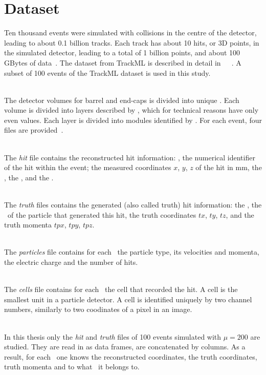 \section{Dataset}

Ten thousand events were simulated with collisions in the centre of the detector, leading to about 0.1 billion tracks. Each track has about 10 hits, or 3D points, in the simulated detector, leading to a total of 1 billion points, and about 100 GBytes of data~\cite{TrackMLPPTAfter2}. The dataset from TrackML is described in detail in~\cite{TrackMLPaperAccuracyPhase}~\cite{TrackMLPaper}~\cite{TrackMLPaperHAL}. A subset of 100 events of the TrackML dataset is used in this study.

\ \\The detector volumes for barrel and end-caps is divided into unique \volumeID. Each volume is divided into layers described by \layerID, which for technical reasons have only even values. Each layer is divided into modules identified by \moduleID. For each event, four files are provided~\cite{TrackMLPaper}.

\ \\The \emph{hit} file contains the reconstructed hit information: \hitID, the numerical identifier of the hit within the event; the measured coordinates $x$, $y$, $z$ of the hit in mm, the \volumeID, the \layerID, and the \moduleID.

\ \\The \emph{truth} files contains the generated (also called truth) hit information: the \hitID, the \particleID~of the particle that generated this hit, the truth coordinates $tx$, $ty$, $tz$, and the truth momenta $tpx$, $tpy$, $tpz$. 

\ \\The \emph{particles} file contains for each \particleID~the particle type, its velocities and momenta, the electric charge and the number of hits.

\ \\The \emph{cells} file contains for each \hitID~the cell that recorded the hit. A cell is the smallest unit in a particle detector. A cell is identified uniquely by two channel numbers, similarly to two coodinates of a pixel in an image. 

\ \\In this thesis only the \emph{hit} and \emph{truth} files of 100 events simulated with $\mu=200$ are studied. They are read in as data frames, are concatenated by columns. As a result, for each \hitID~one knows the reconstructed coordinates, the truth coordinates, truth momenta and to what \particleID~it belongs to. 

